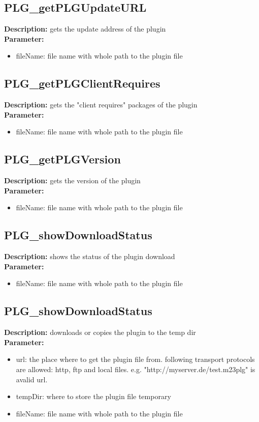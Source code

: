 \subsection{PLG\_getPLGUpdateURL}
\textbf{Description:} gets the update address of the plugin\\
\textbf{Parameter:}
\begin{itemize}
\item fileName: file name with whole path to the plugin file
\end{itemize}

\subsection{PLG\_getPLGClientRequires}
\textbf{Description:} gets the "client requires" packages of the plugin\\
\textbf{Parameter:}
\begin{itemize}
\item fileName: file name with whole path to the plugin file
\end{itemize}

\subsection{PLG\_getPLGVersion}
\textbf{Description:} gets the version of the plugin\\
\textbf{Parameter:}
\begin{itemize}
\item fileName: file name with whole path to the plugin file
\end{itemize}

\subsection{PLG\_showDownloadStatus}
\textbf{Description:} shows the status of the plugin download\\
\textbf{Parameter:}
\begin{itemize}
\item fileName: file name with whole path to the plugin file
\end{itemize}

\subsection{PLG\_showDownloadStatus}
\textbf{Description:} downloads or copies the plugin to the temp dir\\
\textbf{Parameter:}
\begin{itemize}
\item url: the place where to get the plugin file from. following transport protocols are allowed: http, ftp and local files. e.g. "http://myserver.de/test.m23plg" is avalid url.
\item tempDir: where to store the plugin file temporary
\item fileName: file name with whole path to the plugin file
\end{itemize}

